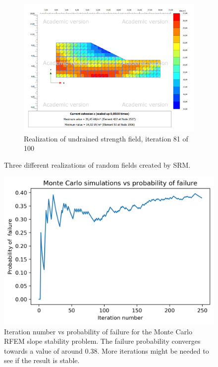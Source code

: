 \begin{figure}
\begin{subfigure}{0.475\textwidth}
    \includegraphics[width=\textwidth]{fig/ss/testp20211118-130042}
    \caption[]%
    {{\small Realization of undrained strength field, iteration 81 of 100}}
    \label{fig:mean and std of net66}
\end{subfigure}
\caption[ Three different realizations of random fields created by SRM.]
{\small Three different realizations of random fields created by SRM.}
\label{fig:fourslopesfields}
\end{figure}


\begin{figure}[h]
	\includegraphics[width=\textwidth]{fig/pfailit20211116-090042}
	\caption{Iteration number vs probability of failure for the Monte Carlo RFEM slope stability problem. The failure probability converges towards a value of around 0.38. More iterations might be needed to see if the result is stable.}
	\label{fig:mc4}
\end{figure}

